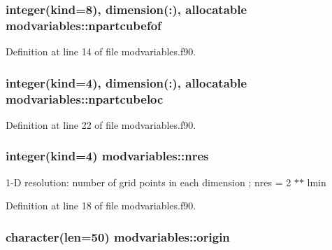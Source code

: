 \subsubsection[{\texorpdfstring{npartcubefof}{npartcubefof}}]{\setlength{\rightskip}{0pt plus 5cm}integer(kind=8), dimension(\+:), allocatable modvariables\+::npartcubefof}\hypertarget{namespacemodvariables_a5e0afff3c4cb1ac79dd8ec2f3a7752d9}{}\label{namespacemodvariables_a5e0afff3c4cb1ac79dd8ec2f3a7752d9}


Definition at line 14 of file modvariables.\+f90.

\subsubsection[{\texorpdfstring{npartcubeloc}{npartcubeloc}}]{\setlength{\rightskip}{0pt plus 5cm}integer(kind=4), dimension(\+:), allocatable modvariables\+::npartcubeloc}\hypertarget{namespacemodvariables_a32098f5e276eab031b1feebf7124f8bf}{}\label{namespacemodvariables_a32098f5e276eab031b1feebf7124f8bf}


Definition at line 22 of file modvariables.\+f90.

\subsubsection[{\texorpdfstring{nres}{nres}}]{\setlength{\rightskip}{0pt plus 5cm}integer(kind=4) modvariables\+::nres}\hypertarget{namespacemodvariables_aa678ff0ebe26f3b0510eba5a59a69e61}{}\label{namespacemodvariables_aa678ff0ebe26f3b0510eba5a59a69e61}


1-\/D resolution\+: number of grid points in each dimension ; nres = 2 $\ast$$\ast$ lmin 



Definition at line 18 of file modvariables.\+f90.

\subsubsection[{\texorpdfstring{origin}{origin}}]{\setlength{\rightskip}{0pt plus 5cm}character(len=50) modvariables\+::origin}\hypertarget{namespacemodvariables_a9f9928f8307cdd707b3a7d360a992f9f}{}\label{namespacemodvariables_a9f9928f8307cdd707b3a7d360a992f9f}


